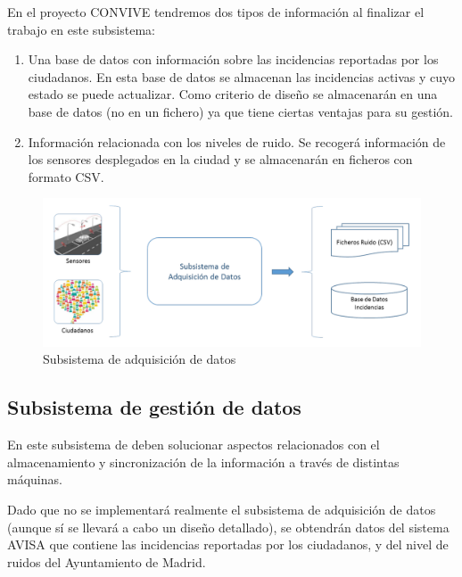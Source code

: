 \documentclass[
  a4paper,
]{scrreport}
\providecommand{\tightlist}{%
  \setlength{\itemsep}{0pt}\setlength{\parskip}{0pt}}\usepackage{longtable,booktabs,array}
\begin{document}
En el proyecto CONVIVE tendremos dos tipos de información al finalizar
el trabajo en este subsistema:

\begin{enumerate}
\def\labelenumi{\arabic{enumi}.}
\tightlist
\item
  Una base de datos con información sobre las incidencias reportadas por
  los ciudadanos. En esta base de datos se almacenan las incidencias
  activas y cuyo estado se puede actualizar. Como criterio de diseño se
  almacenarán en una base de datos (no en un fichero) ya que tiene
  ciertas ventajas para su gestión.
\item
  Información relacionada con los niveles de ruido. Se recogerá
  información de los sensores desplegados en la ciudad y se almacenarán
  en ficheros con formato CSV.
\end{enumerate}

\begin{figure}

{\centering \includegraphics{./img/convive/subsistema-adquisicion-datos.png}

}

\caption{Subsistema de adquisición de datos}

\end{figure}

\hypertarget{subsistema-de-gestiuxf3n-de-datos}{%
\subsection{Subsistema de gestión de
datos}\label{subsistema-de-gestiuxf3n-de-datos}}

En este subsistema de deben solucionar aspectos relacionados con el
almacenamiento y sincronización de la información a través de distintas
máquinas.

Dado que no se implementará realmente el subsistema de adquisición de
datos (aunque sí se llevará a cabo un diseño detallado), se obtendrán
datos del sistema AVISA que contiene las incidencias reportadas por los
ciudadanos, y del nivel de ruidos del Ayuntamiento de Madrid.
\end{document}
